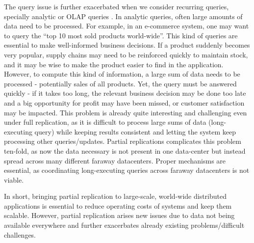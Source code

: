 The query issue is further exacerbated when we consider recurring queries, specially analytic or OLAP queries \cite{dbtoaster,viewSelection}.
In analytic queries, often large amounts of data need to be processed.
For example, in an e-commerce system, one may want to query the ``top 10 most sold products world-wide''.
This kind of queries are essential to make well-informed business decisions.
If a product suddenly becomes very popular, supply chains may need to be reinforced quickly to maintain stock, and it may be wise to make the product easier to find in the application.
However, to compute this kind of information, a large sum of data needs to be processed - potentially sales of all products.
Yet, the query must be answered quickly - if it takes too long, the relevant business decision may be done too late and a big opportunity for profit may have been missed, or customer satisfaction may be impacted.
This problem is already quite interesting and challenging even under full replication, as it is difficult to process large sums of data (long-executing query) while keeping results consistent and letting the system keep processing other queries/updates.
Partial replications complicates this problem ten-fold, as now the data necessary is not present in one data-center but instead spread across many different faraway datacenters.
Proper mechanisms are essential, as coordinating long-executing queries across faraway datacenters is not viable.

In short, bringing partial replication to large-scale, world-wide distributed applications is essential to reduce operating costs of systems and keep them scalable.
However, partial replication arises new issues due to data not being available everywhere and further exacerbates already existing problems/difficult challenges.






